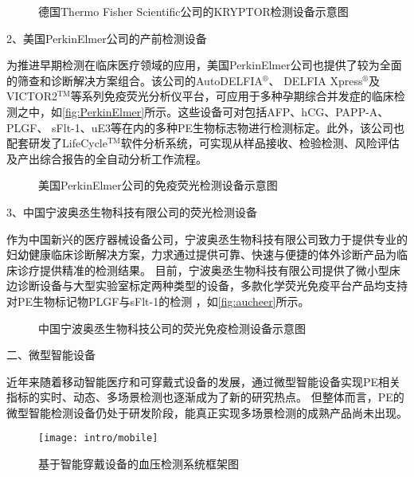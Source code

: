 \begin{figure}[htbp]
    \centering
    \quad
    \caption{\label{fig:B·R·A·H·M·S}德国Thermo Fisher Scientific公司的KRYPTOR检测设备示意图}
\end{figure}

2、美国PerkinElmer公司的产前检测设备

为推进早期检测在临床医疗领域的应用，美国PerkinElmer公司也提供了较为全面的筛查和诊断解决方案组合\cite{perkinelmer2023}。该公司的AutoDELFIA$^\circledR$、
DELFIA Xpress$^\circledR$及VICTOR2$^\text{TM}$等系列免疫荧光分析仪平台，可应用于多种孕期综合并发症的临床检测之中，如\autoref{fig:PerkinElmer}所示。这些设备可对包括AFP、hCG、PAPP-A、PLGF、
sFlt-1、uE3等在内的多种PE生物标志物进行检测标定。此外，该公司也配套研发了LifeCycle$^\text{TM}$软件分析系统，可实现从样品接收、检验检测、风险评估及产出综合报告的全自动分析工作流程。

\begin{figure}[htbp]
    \centering
    \quad
    \caption{\label{fig:PerkinElmer}美国PerkinElmer公司的免疫荧光检测设备示意图}
\end{figure}

3、中国宁波奥丞生物科技有限公司的荧光检测设备

作为中国新兴的医疗器械设备公司，宁波奥丞生物科技有限公司致力于提供专业的妇幼健康临床诊断解决方案，力求通过提供可靠、快速与便捷的体外诊断产品为临床诊疗提供精准的检测结果。
目前，宁波奥丞生物科技有限公司提供了微小型床边诊断设备与大型实验室标定两种类型的设备，多款化学荧光免疫平台产品均支持对PE生物标记物PLGF与sFlt-1的检测
，如\autoref{fig:aucheer}所示\cite{aucheer2023}。
\begin{figure}[h]
    \centering
    \quad
    \caption{\label{fig:aucheer}中国宁波奥丞生物科技公司的荧光免疫检测设备示意图}
\end{figure}

二、微型智能设备

近年来随着移动智能医疗和可穿戴式设备的发展，通过微型智能设备实现PE相关指标的实时、动态、多场景检测也逐渐成为了新的研究热点。
但整体而言，PE的微型智能检测设备仍处于研发阶段，能真正实现多场景检测的成熟产品尚未出现。
\begin{figure}[ht]
    \centering
    \texttt{[image: intro/mobile]}
    \caption[基于智能穿戴设备的血压检测系统框架图]{\label{fig:mobile}基于智能穿戴设备的血压检测系统框架图\cite{Marin2019,Marin2020}}
\end{figure}

